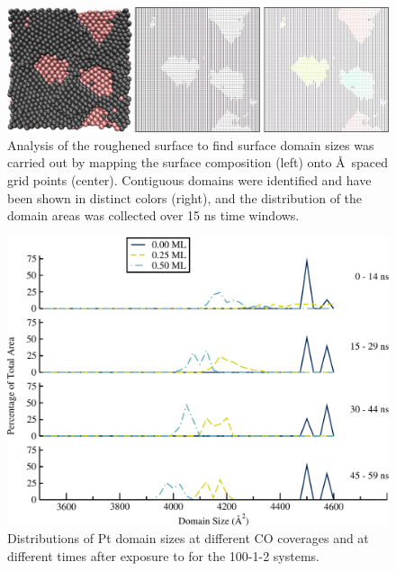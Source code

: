 \begin{landscape}
\begin{figure}[p!]
\centering
  \includegraphics[width=\linewidth]{../figures/appC/grid_small.pdf}
  \caption{Analysis of the roughened surface to find surface domain sizes was
carried out by mapping the surface composition (left) onto \AA\ spaced grid
points (center). Contiguous domains were identified and have been shown in
distinct colors (right), and the distribution of the domain areas was collected
over 15 ns time windows.}
\label{fig:surfaceGrid}
\end{figure}
\end{landscape}


\begin{figure}[p!]
\centering
  \includegraphics[width=\linewidth]{../figures/appC/ds_100_1Pt_2Pd_Pt.pdf}
  \caption{Distributions of Pt domain sizes at different CO coverages and at
different times after exposure to  for the 100-1-2
systems.}
\label{fig:ds100Pt}
\end{figure}


